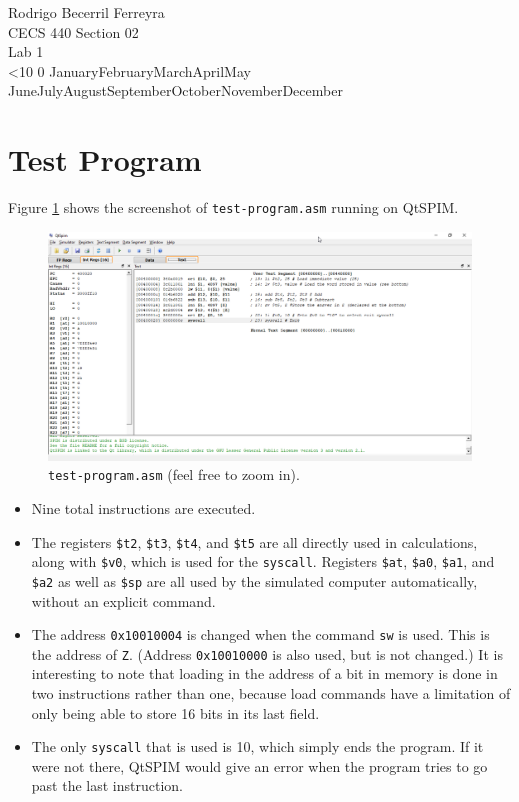 \documentclass{article}
\renewcommand{\c}[1]{\texttt{#1}}
\renewcommand{\today}{\ifnum\number\day<10 0\fi \number\day \space%
\ifcase \month \or January\or February\or March\or April\or May%
\or June\or July\or August\or September\or October\or November\or December\fi\space%
\number \year}
\begin{document}
\noindent
Rodrigo Becerril Ferreyra\\
CECS 440 Section 02\\
Lab 1\\
\today

\section{Test Program}
Figure \ref{screenshot:test-program} shows the screenshot of
\c{test-program.asm} running on QtSPIM.

\begin{figure}[H]
    \centering
    \includegraphics[width=\textwidth]{Images/QtSPIMtestprogram}
    \caption{\c{test-program.asm} (feel free to zoom in).}
    \label{screenshot:test-program}
\end{figure}

\begin{itemize}
    \item Nine total instructions are executed.
    \item The registers \c{\$t2}, \c{\$t3}, \c{\$t4}, and
    \c{\$t5} are all directly used in calculations, along with
    \c{\$v0}, which is used for the \c{syscall}.
    Registers \c{\$at},
    \c{\$a0}, \c{\$a1}, and \c{\$a2} as well as \c{\$sp} are
    all used by the simulated computer automatically, without
    an explicit command.
    \item The address \c{0x10010004} is changed when the command
    \c{sw} is used. This is the address of \c{Z}. (Address
    \c{0x10010000} is also used, but is not changed.)
    It is interesting to note that loading in the address of
    a bit in memory is done in two instructions rather than one,
    because load commands have a limitation of only being able
    to store 16 bits in its last field.
    \item The only \c{syscall} that is used is 10, which
    simply ends the program. If it were not there, QtSPIM
    would give an error when the program tries to go past
    the last instruction.
\end{itemize}
\end{document}

